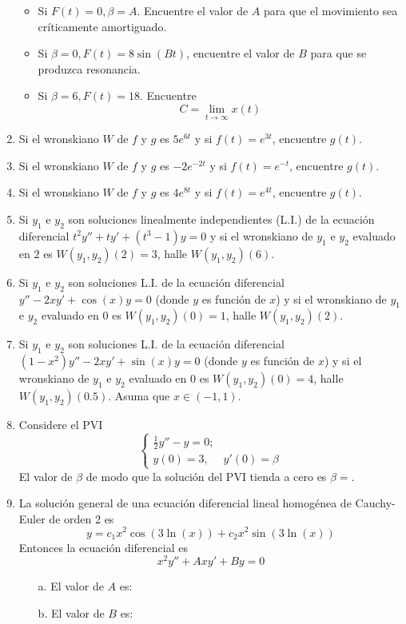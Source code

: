 \begin{enumerate}
\begin{itemize}
    \item Si $F(t) = 0, \beta = A$. Encuentre el valor de $A$ para que el movimiento sea críticamente amortiguado.
    \item Si $\beta = 0, F(t) = 8\sin(Bt)$, encuentre el valor de $B$ para que se produzca resonancia.
    \item Si $\beta = 6, F(t) = 18$. Encuentre $$C = \lim_{t\to \infty} x(t)$$
\end{itemize}
\item Si el wronskiano $W$ de $f$ y $g$ es $5e^{6t}$ y si $f(t) = e^{3t}$, encuentre $g(t)$.

\item Si el wronskiano $W$ de $f$ y $g$ es $-2e^{-2t}$ y si $f(t) = e^{-t}$, encuentre $g(t)$.

\item Si el wronskiano $W$ de $f$ y $g$ es $4e^{8t}$ y si $f(t) = e^{4t}$, encuentre $g(t)$.

\item Si $y_1$ e $y_2$ son soluciones linealmente independientes (L.I.) de la ecuación diferencial $t^2 y'' + ty' + (t^3-1)y = 0$ y si el wronskiano de $y_1$ e $y_2$ evaluado en $2$ es $W(y_1, y_2)(2) = 3$, halle $W(y_1, y_2)(6)$.

\item Si $y_1$ e $y_2$ son soluciones L.I. de la ecuación diferencial $y'' - 2xy' + \cos(x) y = 0$ (donde $y$ es función de $x$) y si el wronskiano de $y_1$ e $y_2$ evaluado en $0$ es $W(y_1, y_2)(0) = 1$, halle $W(y_1, y_2)(2)$.

\item Si $y_1$ e $y_2$ son soluciones L.I. de la ecuación diferencial $(1-x^2)y'' - 2xy' + \sin(x) y = 0$ (donde $y$ es función de $x$) y si el wronskiano de $y_1$ e $y_2$ evaluado en $0$ es $W(y_1, y_2)(0) = 4$, halle $W(y_1, y_2)(0.5)$. Asuma que $x \in (-1,1)$.

\item Considere el PVI 
$$\begin{cases}
    \frac{1}{2}y'' - y = 0; \\
    y(0) = 3, & y'(0) = \beta
\end{cases}$$
El valor de $\beta$ de modo que la solución del PVI tienda a cero es $\beta = $.

\item La solución general de una ecuación diferencial lineal  homogénea de Cauchy-Euler de orden 2 es
$$y= c_1x^2\cos(3\ln(x)) + c_2x^2\sin(3\ln(x))$$
Entonces la ecuación diferencial es
$$x^2y'' + Axy' + By = 0$$
\begin{itemize}
    \item[a.] El valor de $A$ es:
    \item[b.] El valor de $B$ es: 
\end{itemize}


\end{enumerate}
